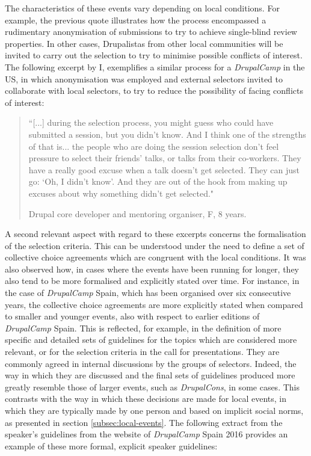 The characteristics of these events vary depending on local conditions. For example, the previous quote illustrates how the process encompassed a rudimentary anonymisation of submissions to try to achieve single-blind review properties. In other cases, Drupalistas from other local communities will be invited to carry out the selection to try to minimise possible conflicts of interest. The following excerpt by I, exemplifies a similar process for a \textit{DrupalCamp} in the US, in which anonymisation was employed and external selectors invited to collaborate with local selectors, to try to reduce the possibility of facing conflicts of interest:

\begin{quotation}
``[...] during the selection process, you might guess who could have submitted a session, but you didn't know. And I think one of the strengths of that is... the people who are doing the session selection don't feel pressure to select their friends' talks, or talks from their co-workers. They have a really good excuse when a talk doesn't get selected. They can just go: `Oh, I didn't know'. And they are out of the hook from making up excuses about why something didn't get selected."

\begin{flushright}\footnotesize{Drupal core developer and mentoring organiser, F, 8 years.}\end{flushright}
\end{quotation}

A second relevant aspect with regard to these excerpts concerns the formalisation of the selection criteria. This can be understood under the need to define a set of collective choice agreements which are congruent with the local conditions. It was also observed how, in cases where the events have been running for longer, they also tend to be more formalised and explicitly stated over time. For instance, in the case of \textit{DrupalCamp} Spain, which has been organised over six consecutive years, the collective choice agreements are more explicitly stated when compared to smaller and younger events, also with respect to earlier editions of \textit{DrupalCamp} Spain. This is reflected, for example, in the definition of more specific and detailed sets of guidelines for the topics which are considered more relevant, or for the selection criteria in the call for presentations. They are commonly agreed in internal discussions by the groups of selectors. Indeed, the way in which they are discussed and the final sets of guidelines produced more greatly resemble those of larger events, such as \textit{DrupalCons}, in some cases. This contrasts with the way in which these decisions are made for local events, in which they are typically made by one person and based on implicit social norms, as presented in section \ref{subsec:local-events}. The following extract from the speaker's guidelines from the website of \textit{DrupalCamp} Spain 2016 provides an example of these more formal, explicit speaker guidelines:

